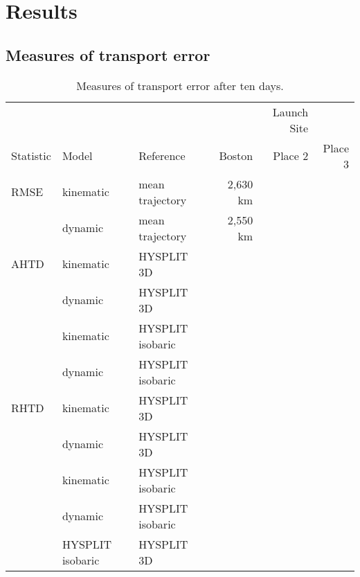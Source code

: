 \chapter{Results}

\section{Measures of transport error}

\begin{table}
    \centering
    \caption{Measures of transport error after ten days.}    
    \begin{tabular}{ l l l r r r }
        \hline
        \hline
        			&				&				& 		& Launch Site\\
	\cline{4-6}
        Statistic 	& Model 			& Reference 		& Boston 		& Place 2	& Place 3 \\
        \hline
        RMSE	& kinematic 		& mean trajectory	& 2,630 km	&		& \\
        		 	& dynamic 		& mean trajectory	& 2,550 km	&		& \\
        AHTD 	& kinematic		& HYSPLIT 3D		&			&		& \\
        		 	& dynamic			& HYSPLIT 3D 		&			&		& \\
        		 	& kinematic		& HYSPLIT isobaric  &			&		& \\
        		 	& dynamic			& HYSPLIT isobaric  &			&		& \\
        RHTD 	& kinematic		& HYSPLIT 3D		&			&		& \\
        		 	& dynamic			& HYSPLIT 3D 		&			&		& \\
        		 	& kinematic		& HYSPLIT isobaric  &			&		& \\
        		 	& dynamic			& HYSPLIT isobaric  &			&		& \\
			& HYSPLIT isobaric	& HYSPLIT 3D 		&			&		& \\	
        \hline
    \end{tabular}
\end{table}